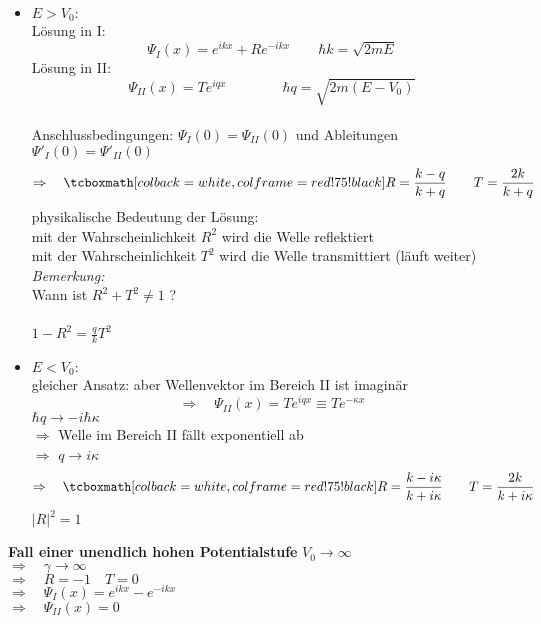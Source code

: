 \begin{itemize}
	\item $ E > V_0 : $\\
	Lösung in I:
	\begin{equation*}
	\Psi_{I}(x) = e^{i k x} + R e^{- i k x} \qquad \hbar k = \sqrt{2 m E}
	\end{equation*}
	Lösung in II:
	\begin{equation*}
	\Psi_{II}(x) = T e^{i q x} \qquad \qquad \hbar q = \sqrt{2 m (E - V_0)}
	\end{equation*}
	\\
	Anschlussbedingungen: $ \Psi_{I}(0) = \Psi_{II}(0) $ und Ableitungen $ \Psi'_{I}(0) = \Psi'_{II}(0) $
	\begin{equation*}
	\Rightarrow \quad \rmbox{ R = \frac{k - q}{k + q} \qquad T = \frac{2 k}{k + q} }
	\end{equation*}
	physikalische Bedeutung der Lösung:\\
	mit der Wahrscheinlichkeit $ R^2 $ wird die Welle reflektiert \\
	mit der Wahrscheinlichkeit $ T^2 $ wird die Welle transmittiert (läuft weiter)\\[5pt]
	\emph{Bemerkung:}\\
	Wann ist $ R^2 + T^2 \neq 1 $ ?\\
	\\
	$ 1 - R^2 = \frac{q}{k} T^2 $
	\item $ E < V_0 : $\\
	gleicher Ansatz: aber Wellenvektor im Bereich II ist imaginär
	\begin{equation*}
	\Rightarrow \quad \Psi_{II}(x) = T e^{i q x} \equiv T e^{- \kappa x}
	\end{equation*}
	$ \hbar q \rightarrow - i \hbar \kappa $\\
	$ \Rightarrow $ Welle im Bereich II fällt exponentiell ab\\
	$ \Rightarrow $ $ q \to i \kappa $
	\begin{equation*}
	\Rightarrow \quad \rmbox{ R = \frac{k - i \kappa}{k + i \kappa} \qquad T = \frac{2 k}{k + i \kappa} }
	\end{equation*}
	$ |R|^2 = 1 $\\
\end{itemize}
\textbf{Fall einer unendlich hohen Potentialstufe} $ V_0 \to \infty $\\
$ \Rightarrow \quad \gamma \to \infty $\\
$ \Rightarrow \quad R = - 1 \quad T = 0$\\
$ \Rightarrow \quad \Psi_{I}(x) = e^{i k x} - e^{- i k x} $\\
$ \Rightarrow \quad \Psi_{II}(x) = 0 $



